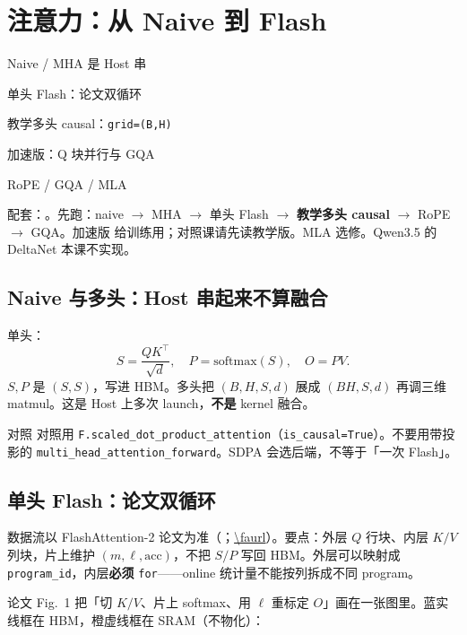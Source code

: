 \chapter{注意力：从 Naive 到 Flash}

\begin{introduction}
  \item Naive / MHA 是 Host 串
  \item 单头 Flash：论文双循环
  \item 教学多头 causal：\texttt{grid=(B,H)}
  \item 加速版：Q 块并行与 GQA
  \item RoPE / GQA / MLA
\end{introduction}

配套：。先跑：naive $\to$ MHA $\to$ 单头 Flash $\to$ \textbf{教学多头 causal} $\to$ RoPE $\to$ GQA。加速版  给训练用；对照课请先读教学版。MLA 选修。Qwen3.5 的 DeltaNet 本课不实现。

\section{Naive 与多头：Host 串起来不算融合}

单头：
\[
S=\frac{QK^\top}{\sqrt{d}},\quad
P=\mathrm{softmax}(S),\quad
O=PV.
\]
$S,P$ 是 $(S,S)$，写进 HBM。多头把 $(B,H,S,d)$ 展成 $(BH,S,d)$ 再调三维 matmul。这是 Host 上多次 launch，\textbf{不是} kernel 融合。

\fignaiveattn

\begin{proposition}{对照}
对照用 \texttt{F.scaled\_dot\_product\_attention}（\texttt{is\_causal=True}）。不要用带投影的 \texttt{multi\_head\_attention\_forward}。SDPA 会选后端，不等于「一次 Flash」。
\end{proposition}

\section{单头 Flash：论文双循环}

数据流以 FlashAttention-2 论文为准（\facite；\url{\faurl}）。要点：外层 $Q$ 行块、内层 $K/V$ 列块，片上维护 $(m,\ell,\mathrm{acc})$，不把 $S/P$ 写回 HBM。外层可以映射成 \texttt{program\_id}，内层\textbf{必须} \texttt{for}——online 统计量不能按列拆成不同 program。

论文 Fig.~1 把「切 $K/V$、片上 softmax、用 $\ell$ 重标定 $O$」画在一张图里。蓝实线框在 HBM，橙虚线框在 SRAM（不物化）：


